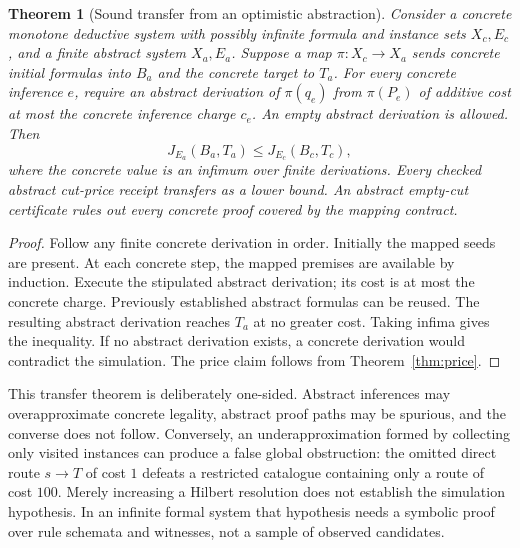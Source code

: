 \documentclass[11pt]{article}
\newtheorem{theorem}{Theorem}[section]
\theoremstyle{remark}\newtheorem{remark}[theorem]{Remark}
\begin{document}
\begin{theorem}[Sound transfer from an optimistic abstraction]\label{thm:transfer}
Consider a concrete monotone deductive system with possibly infinite formula and instance sets $X_c,E_c$, and a finite abstract system $X_a,E_a$. Suppose a map $\pi:X_c\to X_a$ sends concrete initial formulas into $B_a$ and the concrete target to $T_a$. For every concrete inference $e$, require an abstract derivation of $\pi(q_e)$ from $\pi(P_e)$ of additive cost at most the concrete inference charge $c_e$. An empty abstract derivation is allowed. Then
\[
J_{E_a}(B_a,T_a)\leq J_{E_c}(B_c,T_c),
\]
where the concrete value is an infimum over finite derivations. Every checked abstract cut-price receipt transfers as a lower bound. An abstract empty-cut certificate rules out every concrete proof covered by the mapping contract.
\end{theorem}
\begin{proof}
Follow any finite concrete derivation in order. Initially the mapped seeds are present. At each concrete step, the mapped premises are available by induction. Execute the stipulated abstract derivation; its cost is at most the concrete charge. Previously established abstract formulas can be reused. The resulting abstract derivation reaches $T_a$ at no greater cost. Taking infima gives the inequality. If no abstract derivation exists, a concrete derivation would contradict the simulation. The price claim follows from Theorem~\ref{thm:price}.
\end{proof}
This transfer theorem is deliberately one-sided. Abstract inferences may overapproximate concrete legality, abstract proof paths may be spurious, and the converse does not follow. Conversely, an underapproximation formed by collecting only visited instances can produce a false global obstruction: the omitted direct route $s\to T$ of cost $1$ defeats a restricted catalogue containing only a route of cost $100$. Merely increasing a Hilbert resolution does not establish the simulation hypothesis. In an infinite formal system that hypothesis needs a symbolic proof over rule schemata and witnesses, not a sample of observed candidates.
\end{document}
